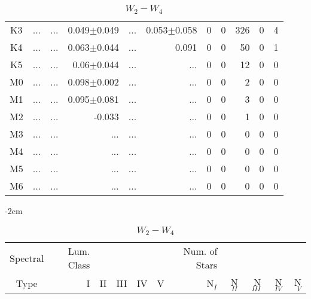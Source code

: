 \begin{table}[t]
\begin{table}[t]
\begin{center}
\begin{tabular}{c|rrrrr|rrrrr}
    K3	&	 ...	&	 ...	&	0.049$\pm$0.049	&	 ...	&	0.053$\pm$0.058	&	0	&	0	&	326	&	0	&	4	\\
    K4	&	 ...	&	 ...	&	0.063$\pm$0.044	&	 ...	&	0.091	&	0	&	0	&	50	&	0	&	1	\\
    K5	&	 ...	&	 ...	&	0.06$\pm$0.044	&	 ...	&	 ...	&	0	&	0	&	12	&	0	&	0	\\
    M0	&	 ...	&	 ...	&	0.098$\pm$0.002	&	 ...	&	 ...	&	0	&	0	&	2	&	0	&	0	\\
    M1	&	 ...	&	 ...	&	0.095$\pm$0.081	&	 ...	&	 ...	&	0	&	0	&	3	&	0	&	0	\\
    M2	&	 ...	&	 ...	&	-0.033	&	 ...	&	 ...	&	0	&	0	&	1	&	0	&	0	\\
    M3	&	 ...	&	 ...	&	 ...	&	 ...	&	 ...	&	0	&	0	&	0	&	0	&	0	\\
    M4	&	 ...	&	 ...	&	 ...	&	 ...	&	 ...	&	0	&	0	&	0	&	0	&	0	\\
    M5	&	 ...	&	 ...	&	 ...	&	 ...	&	 ...	&	0	&	0	&	0	&	0	&	0	\\
    M6	&	 ...	&	 ...	&	 ...	&	 ...	&	 ...	&	0	&	0	&	0	&	0	&	0	\\
        \bottomrule
        \end{tabular}
    \end{center}
    \end{table}
    
    
    \begin{table}[t]
    \tiny
    \centering
    \caption{$W_{2}-W_{4}$}
    \begin{center}
        \addtolength{\leftskip} {-2cm}
        \addtolength{\rightskip}{-2cm}
        \begin{tabular}{c|rrrrr|rrrrr}
        \toprule
        Spectral & Lum. Class & & & & & Num. of Stars & & & &  \\
        Type & I & II & III &  IV & V & N$_{I}$ & N$_{II}$ & N$_{III}$ & N$_{IV}$ & N$_{V}$ \\ \midrule
      

\end{tabular}
\end{center}
\end{table}
\end{table}
